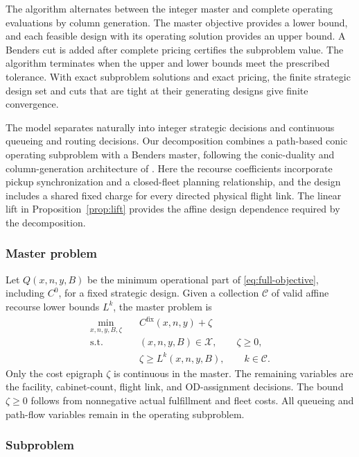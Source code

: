 \documentclass[final,3p,authoryear]{elsarticle}
\begin{document}
The algorithm alternates between the integer master and complete operating evaluations by column generation.
The master objective provides a lower bound, and each feasible design with its operating solution provides an upper bound.
A Benders cut is added after complete pricing certifies the subproblem value.
The algorithm terminates when the upper and lower bounds meet the prescribed tolerance.
With exact subproblem solutions and exact pricing, the finite strategic design set and cuts that are tight at their generating designs give finite convergence.

\label{sec:solution_methods}
The model separates naturally into integer strategic decisions and continuous queueing and routing decisions.
Our decomposition combines a path-based conic operating subproblem with a Benders master, following the conic-duality and column-generation architecture of \citet{Bayram2023}.
Here the recourse coefficients incorporate pickup synchronization and a closed-fleet planning relationship, and the design includes a shared fixed charge for every directed physical flight link.
The linear lift in Proposition~\ref{prop:lift} provides the affine design dependence required by the decomposition.

\subsubsection{Master problem}

Let $Q(x,n,y,B)$ be the minimum operational part of \eqref{eq:full-objective}, including $C^0$, for a fixed strategic design.
Given a collection $\mathcal C$ of valid affine recourse lower bounds $L^k$, the master problem is
\begin{equation}
 \begin{aligned}
 \min_{x,n,y,B,\zeta}\quad&C^{\mathrm{fix}}(x,n,y)+\zeta\\
 \text{s.t.}\quad&(x,n,y,B)\in\mathcal X,\qquad\zeta\ge0,\\
 &\zeta\ge L^k(x,n,y,B),\qquad k\in\mathcal C.
 \end{aligned}
 \label{eq:master}
\end{equation}
Only the cost epigraph $\zeta$ is continuous in the master.
The remaining variables are the facility, cabinet-count, flight link, and OD-assignment decisions.
The bound $\zeta\ge0$ follows from nonnegative actual fulfillment and fleet costs.
All queueing and path-flow variables remain in the operating subproblem.

\subsubsection{Subproblem}
\end{document}
